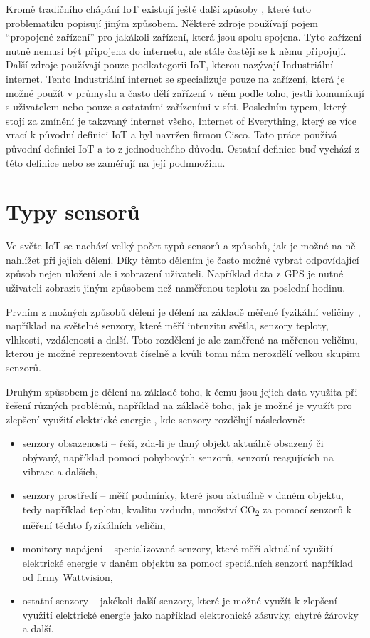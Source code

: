 Kromě tradičního chápání IoT existují ještě další způsoby \cite{greengard2015internet}, které tuto problematiku popisují jiným způsobem. Některé zdroje používají pojem “propojené zařízení” pro jakákoli zařízení, která jsou spolu spojena. Tyto zařízení nutně nemusí být připojena do internetu, ale stále častěji se k němu připojují. Další zdroje používají pouze podkategorii IoT, kterou nazývají Industriální internet. Tento Industriální internet se specializuje pouze na zařízení, která je možné použít v průmyslu a často dělí zařízení v něm podle toho, jestli komunikují s uživatelem nebo pouze s ostatními zařízeními v síti. Posledním typem, který stojí za zmínění je takzvaný internet všeho, Internet of Everything, který se více vrací k původní definici IoT a byl navržen firmou Cisco. Tato práce používá původní definici IoT a to z jednoduchého důvodu. Ostatní definice buď vychází z této definice nebo se zaměřují na její podmnožinu.

\section{Typy sensorů}
Ve světe IoT se nachází velký počet typů sensorů a způsobů, jak je možné na ně nahlížet při jejich dělení. Díky těmto dělením je často možné vybrat odpovídající způsob nejen uložení ale i zobrazení uživateli. Například data z GPS je nutné uživateli zobrazit jiným způsobem než naměřenou teplotu za poslední hodinu.

Prvním z možných způsobů dělení je dělení na základě měřené fyzikální veličiny \cite{8862778}, například na světelné senzory, které měří intenzitu světla, senzory teploty, vlhkosti, vzdálenosti a další. Toto rozdělení je ale zaměřené na měřenou veličinu, kterou je možné reprezentovat číselně a kvůli tomu nám nerozdělí velkou skupinu senzorů.

Druhým způsobem je dělení na základě toho, k čemu jsou jejich data využita při řešení různých problémů, například na základě toho, jak je možné je využít pro zlepšení využití elektrické energie \cite{7946568}, kde senzory rozdělují následovně:
\begin{itemize}
\item senzory obsazenosti -- řeší, zda-li je daný objekt aktuálně obsazený či obývaný, například pomocí pohybových senzorů, senzorů reagujících na vibrace a dalších,
\item senzory prostředí -- měří podmínky, které jsou aktuálně v daném objektu, tedy například teplotu, kvalitu vzdudu, množství CO\textsubscript{2} za pomocí senzorů k měření těchto fyzikálních veličin,
\item monitory napájení -- specializované senzory, které měří aktuální využití elektrické energie v daném objektu za pomocí speciálních senzorů například od firmy Wattvision,
\item ostatní senzory -- jakékoli další senzory, které je možné využít k zlepšení využití elektrické energie jako například elektronické zásuvky, chytré žárovky a další.
\end{itemize}


